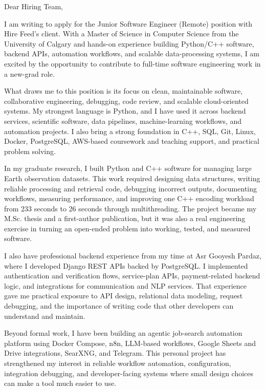 \documentclass[11pt]{letter}
\begin{document}
\begin{letter}{}

\opening{Dear Hiring Team,}

I am writing to apply for the Junior Software Engineer (Remote) position with Hire Feed's client. With a Master of Science in Computer Science from the University of Calgary and hands-on experience building Python/C++ software, backend APIs, automation workflows, and scalable data-processing systems, I am excited by the opportunity to contribute to full-time software engineering work in a new-grad role.

What draws me to this position is its focus on clean, maintainable software, collaborative engineering, debugging, code review, and scalable cloud-oriented systems. My strongest language is Python, and I have used it across backend services, scientific software, data pipelines, machine-learning workflows, and automation projects. I also bring a strong foundation in C++, SQL, Git, Linux, Docker, PostgreSQL, AWS-based coursework and teaching support, and practical problem solving.

In my graduate research, I built Python and C++ software for managing large Earth observation datasets. This work required designing data structures, writing reliable processing and retrieval code, debugging incorrect outputs, documenting workflows, measuring performance, and improving one C++ encoding workload from 233 seconds to 26 seconds through multithreading. The project became my M.Sc. thesis and a first-author publication, but it was also a real engineering exercise in turning an open-ended problem into working, tested, and measured software.

I also have professional backend experience from my time at Asr Gooyesh Pardaz, where I developed Django REST APIs backed by PostgreSQL. I implemented authentication and verification flows, service-plan APIs, payment-related backend logic, and integrations for communication and NLP services. That experience gave me practical exposure to API design, relational data modeling, request debugging, and the importance of writing code that other developers can understand and maintain.

Beyond formal work, I have been building an agentic job-search automation platform using Docker Compose, n8n, LLM-based workflows, Google Sheets and Drive integrations, SearXNG, and Telegram. This personal project has strengthened my interest in reliable workflow automation, configuration, integration debugging, and developer-facing systems where small design choices can make a tool much easier to use.


\end{letter}
\end{document}
